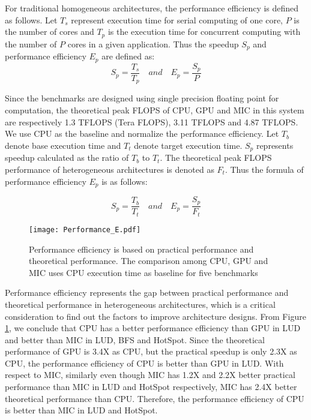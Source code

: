 
  
  For traditional homogeneous architectures, the performance efficiency is defined as follows. Let $T_{s}$ represent execution time for serial computing of one core, $P$ is the number of cores and $T_{p}$ is the execution time for concurrent computing with the number of $P$ cores in a given application. Thus the speedup $S_{p}$ and performance efficiency $E_{p}$ are defined as:
\begin{equation}\label{equ:old_speedup}
	{S_{p}} = \frac{T_{s}}{T_{p}} \quad and \quad {E_{p}} = \frac{S_{p}}{P}
\end{equation}
  
 Since the benchmarks are designed using single precision floating point for computation, the theoretical peak FLOPS of CPU, GPU and MIC in this system are respectively 1.3 TFLOPS (Tera FLOPS), 3.11 TFLOPS and 4.87 TFLOPS. We use CPU as the baseline and normalize the performance efficiency. Let $T_{b}$ denote base execution time and $T_{t}$ denote target execution time. $S_{p}$ represents speedup calculated as the ratio of $T_{b}$ to $T_{t}$. The theoretical peak FLOPS performance of heterogeneous architectures is denoted as $F_{t}$. Thus the formula of performance efficiency $E_{p}$ is as follows:

\begin{equation}\label{equ:new_speedup}
	{S_{p}} = \frac{T_{b}}{T_{t}} \quad and \quad {E_{p}} = \frac{S_{p}}{F_{t}}
\end{equation}

      \begin{figure}[h!]
  \centering
  \begin{minipage}{0.5\textwidth}
    \centering
   \centering
     \texttt{[image: Performance\_E.pdf]}  
\caption{Performance efficiency is based on practical performance and theoretical performance. The comparison among CPU, GPU and MIC uses CPU execution time as baseline for five benchmarks}
\label{fig:performanceE}
\end{minipage}%
\end{figure}
  
Performance efficiency represents the gap between practical performance and theoretical performance in heterogeneous architectures, which is a critical consideration to find out the factors to improve architecture designs. From Figure \ref{fig:performanceE}, we conclude that CPU has a better performance efficiency than GPU in LUD and better than MIC in LUD, BFS and HotSpot. Since the theoretical performance of GPU is 3.4X as CPU, but the practical speedup is only 2.3X as CPU, the performance efficiency of CPU is better than GPU in LUD. With respect to MIC, similarly even though MIC has 1.2X and 2.2X better practical performance than MIC in LUD and HotSpot respectively, MIC has 2.4X better theoretical performance than CPU. Therefore, the performance efficiency of CPU is better than MIC in LUD and HotSpot.



